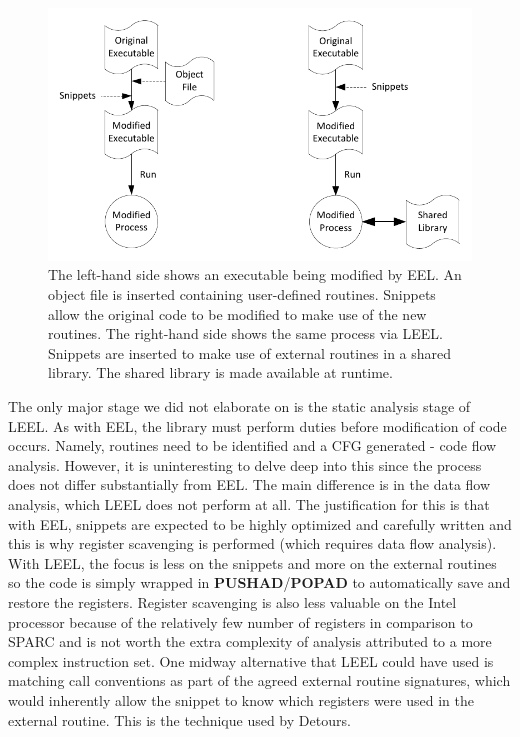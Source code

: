 \begin{figure}[H]
 \centering
 \includegraphics{LEEL_vs_EEL.pdf}
 \caption[LEEL vs EEL]{The left-hand side shows an executable being modified by EEL. An object file is inserted containing user-defined routines. Snippets allow the original code to be modified to make use of the new routines. The right-hand side shows the same process via LEEL. Snippets are inserted to make use of external routines in a shared library. The shared library is made available at runtime.}
\end{figure}

The only major stage we did not elaborate on is the static analysis stage of LEEL. As with EEL, the library must perform duties before modification of code occurs. Namely, routines need to be identified and a CFG generated - code flow analysis. However, it is uninteresting to delve deep into this since the process does not differ substantially from EEL. The main difference is in the data flow analysis, which LEEL does not perform at all. The justification for this is that with EEL, snippets are expected to be highly optimized and carefully written and this is why register scavenging is performed (which requires data flow analysis). With LEEL, the focus is less on the snippets and more on the external routines so the code is simply wrapped in \textbf{PUSHAD}/\textbf{POPAD} to automatically save and restore the registers. Register scavenging is also less valuable on the Intel processor because of the relatively few number of registers in comparison to SPARC and is not worth the extra complexity of analysis attributed to a more complex instruction set. One midway alternative that LEEL could have used is matching call conventions as part of the agreed external routine signatures, which would inherently allow the snippet to know which registers were used in the external routine. This is the technique used by Detours.

